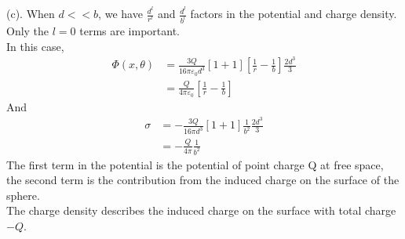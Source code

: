 \documentclass{article}
\begin{document}
\pagebreak
(c). When $d<<b$, we have $\frac{d^l}{r^l}$ and $\frac{d^l}{b^l}$ factors in the potential and charge density. Only the $l=0$ terms are important.\\
In this case,
\begin{align*}
  \Phi(x,\theta)&=\frac{3Q}{16\pi\varepsilon_0 d^3}[1+1][\frac 1r-\frac 1b]\frac{2d^3}{3}\\
                &=\frac{Q}{4\pi\varepsilon_0}[\frac 1r-\frac 1b]              
\end{align*}
And
\begin{align*}
  \sigma&=-\frac{3Q}{16\pi d^3}[1+1]\frac{1}{b^2}\frac{2d^3}{3}\\
        &=-\frac{Q}{4\pi}\frac{1}{b^2}
\end{align*}
The first term in the potential is the potential of point charge Q at free space, the second term is the contribution from the induced charge on the surface of the sphere.\\
The charge density describes the induced charge on the surface with total charge $-Q$.


% 
% 
\end{document}
